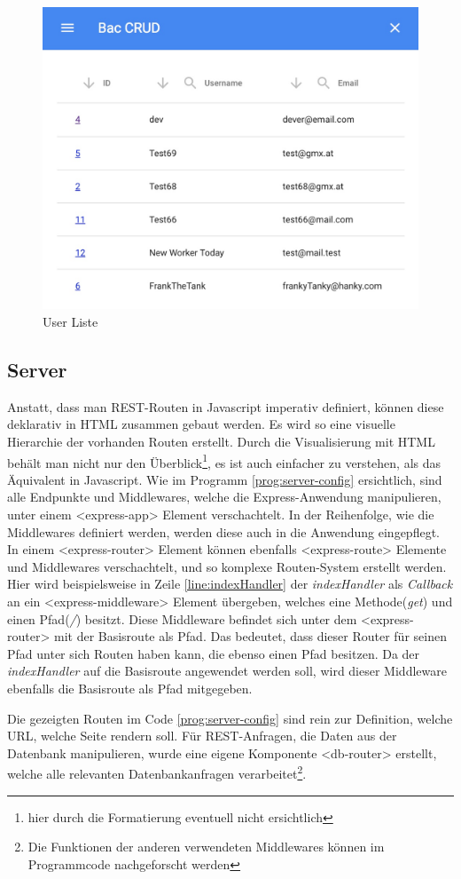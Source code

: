\begin{figure}
	\centering
	\includegraphics[width=0.5\linewidth]{images/user_list.jpeg}
	\caption{User Liste}
	\label{fig:user_list}
\end{figure}

\subsection{Server}
Anstatt, dass man REST-Routen in Javascript imperativ definiert, können diese deklarativ in HTML zusammen gebaut werden. Es wird so eine visuelle Hierarchie der vorhanden Routen erstellt. Durch die Visualisierung mit HTML behält man nicht nur den Überblick\footnote{hier durch die Formatierung eventuell nicht ersichtlich}, es ist auch einfacher zu verstehen, als das Äquivalent in Javascript.
Wie im Programm \ref{prog:server-config} ersichtlich, sind alle Endpunkte und Middlewares, welche die Express-Anwendung manipulieren, unter einem <express-app> Element verschachtelt. In der Reihenfolge, wie die Middlewares definiert werden, werden diese auch in die Anwendung eingepflegt. In einem <express-router> Element können ebenfalls <express-route> Elemente und Middlewares verschachtelt, und so komplexe Routen-System erstellt werden.
Hier wird beispielsweise in Zeile \ref{line:indexHandler} der \textit{indexHandler} als \textit{Callback} an ein <express-middleware> Element übergeben, welches eine Methode(\textit{get}) und einen Pfad(\textit{/})  besitzt. Diese Middleware befindet sich unter dem <express-router> mit der Basisroute als Pfad. Das bedeutet, dass dieser Router für seinen Pfad unter sich Routen haben kann, die ebenso einen Pfad besitzen. Da der \textit{indexHandler} auf die Basisroute angewendet werden soll, wird dieser Middleware ebenfalls die Basisroute als Pfad mitgegeben.

Die gezeigten Routen im Code  \ref{prog:server-config} sind rein zur Definition, welche URL, welche Seite rendern soll. Für REST-Anfragen, die Daten aus der Datenbank manipulieren, wurde eine eigene Komponente <db-router> erstellt, welche alle relevanten Datenbankanfragen verarbeitet\footnote{Die Funktionen der anderen verwendeten Middlewares können im Programmcode nachgeforscht werden}.

